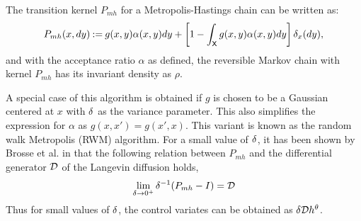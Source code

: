 The transition kernel $P_{mh}$ for a Metropolis-Hastings chain can be written as:
\begin{equation}
P_{mh}(x,dy) \eqdef g(x,y) \alpha(x,y) dy + \left [ 1 - \int_{\state} g(x,y) \alpha(x,y) dy \right] \delta_x (dy),
\label{e:kernel_mh}
\end{equation}
and with the acceptance ratio $\alpha$ as defined, the reversible Markov chain with kernel $P_{mh}$ has its invariant density as $\rho$.

A special case of this algorithm is obtained if $g$ is chosen to be a Gaussian centered at $x$ with $\delta$ as the variance parameter. This also simplifies the expression for $\alpha$ as $g(x,x') = g(x',x)$. This variant is known as the random walk Metropolis (RWM) algorithm. For a small value of $\delta$, it has been shown by Brosse et al. in \cite{brodurmeymourad18} that the following relation between $P_{mh}$ and the differential generator ${\cal D}$ of the Langevin diffusion holds, %
\[
\lim_{\delta \to 0^+} \delta^{-1} (P_{mh} - I) = {\cal D}
\]
Thus for small values of $\delta$, the control variates can be obtained as $\delta {\cal D} h^\theta$. %

